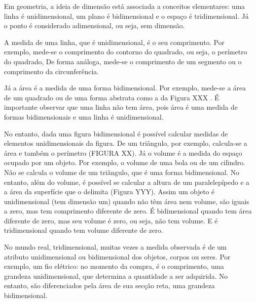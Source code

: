 Em geometria, a ideia de dimensão está associada a conceitos elementares: uma linha é unidimensional, um plano é bidimensional e o espaço é tridimensional. Já o ponto é considerado adimensional, ou seja, sem dimensão.

A medida de uma linha, que é unidimensional, é o seu comprimento. Por exemplo, mede-se o comprimento do contorno do quadrado, ou seja, o perímetro do quadrado, De forma análoga, mede-se o comprimento de um segmento ou o comprimento da circunferência.

Já a área é a medida de uma forma bidimensional. Por exemplo, mede-se a área de um quadrado ou de uma forma abstrata como a da Figura XXX . É importante observar que uma linha não tem área,  pois área é uma medida de formas bidimensionais e uma linha é unidimensional.

No entanto, dada uma figura bidimensional é possível calcular medidas de elementos unidimensionais da figura. De um triângulo, por exemplo, calcula-se a área e também o perímetro (FIGURA XX). Já o volume é a medida do espaço ocupado por um objeto. Por exemplo, o volume de uma bola ou de um cilindro. Não se calcula o volume de um triângulo, que é uma forma bidimensional. No entanto, além do volume, é possível se calcular a altura de um paralelepípedo e a a área da superfície que o delimita (Figura YYY).
Assim um objeto é unidimensional (tem dimensão um) quando não têm área nem volume, são iguais a zero, mas tem comprimento diferente de zero. É bidimensional quando tem área diferente de zero, mas seu volume é zero, ou seja, não tem volume. E é tridimensional quando tem volume diferente de zero.

No mundo real, tridimensional, muitas vezes a medida observada é de um atributo unidimensional ou bidimensional dos objetos, corpos ou seres. Por exemplo, um fio elétrico: no momento da compra, é o comprimento, uma grandeza unidimensional, que determina a quantidade a ser adquirida. No entanto, são diferenciados pela área de sua secção reta, uma grandeza bidimensional.

